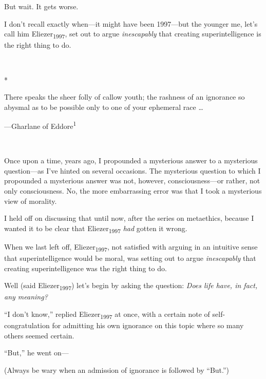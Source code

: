{
 But wait. It gets worse.}

{
 I don't recall exactly when---it might have been
1997---but the younger me, let's call him
Eliezer\textsubscript{1997}, set out to argue \textit{inescapably} that
creating superintelligence is the right thing to do.}

{\centering
 \ ~
\par}

{\centering
 *
\par}


{
 There speaks the sheer folly of callow youth; the rashness of an
ignorance so abysmal as to be possible only to one of your ephemeral
race \ldots}

{\raggedleft
 {}---Gharlane of Eddore\textsuperscript{1}
\par}


\bigskip

{
 ~}

{
 Once upon a time, years ago, I propounded a mysterious answer to a
mysterious question---as I've hinted on several
occasions. The mysterious question to which I propounded a mysterious
answer was not, however, consciousness---or rather, not only
consciousness. No, the more embarrassing error was that I took a
mysterious view of morality.}

{
 I held off on discussing that until now, after the series on
metaethics, because I wanted it to be clear that
Eliezer\textsubscript{1997} \textit{had} gotten it wrong.}

{
 When we last left off, Eliezer\textsubscript{1997}, not satisfied
with arguing in an intuitive sense that superintelligence would be
moral, was setting out to argue \textit{inescapably} that creating
superintelligence was the right thing to do.}

{
 Well (said Eliezer\textsubscript{1997}) let's
begin by asking the question: \textit{Does life have, in fact, any
meaning?}}

{
 ``I don't
know,'' replied Eliezer\textsubscript{1997} at once,
with a certain note of self-congratulation for admitting his own
ignorance on this topic where so many others seemed certain.}

{
 ``But,'' he went on---}

{
 (Always be wary when an admission of ignorance is followed by
``But.'')}

